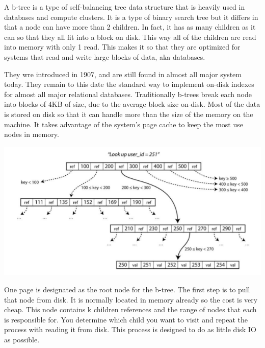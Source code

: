 \documentclass[9pt]{extarticle} %
\begin{document}
%
%
\begin{minipage}[t]{.61\linewidth} %
\vspace{-0.4cm}
\hypertarget{firstnews}{}
 
A b-tree is a type of self-balancing tree data structure that is heavily used in databases and
compute clusters. It is a type of binary search tree but it differs in that a node can have more
than 2 children. In fact, it has as many children as it can so that they all fit into a block on
disk. This way all of the children are read into memory with only 1 read. This makes it so that
they are optimized for systems that read and write large blocks of data, aka databases.

They wre introduced in 1907, and are still found in almost all major system today. They remain
to this date the standard way to implement on-disk indexes for almost all major relational
databases. Traditionally b-trees break each node into blocks of 4KB of size, due to the average
block size on-disk. Most of the data is stored on disk so that it can handle more than the size
of the memory on the machine. It takes advantage of the system's page cache to keep the most use
nodes in memory.

\includegraphics[width=0.8\linewidth]{imgs/b-tree.png}

One page is designated as the root node for the b-tree. The first step is to pull that node from
disk. It is normally located in memory already so the cost is very cheap. This node contains k
children references and the range of nodes that each is responsible for. You determine which
child you want to visit and repeat the process with reading it from disk. This process is designed
to do as little disk IO as possible.


\end{minipage}
\end{document}
